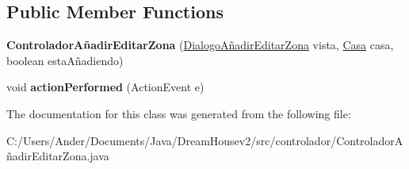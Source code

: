 \subsection*{Public Member Functions}
\begin{DoxyCompactItemize}
\item 
\mbox{\label{classcontrolador_1_1_controlador_a_xC3_xB1adir_editar_zona_a2a27c449b5c5bdd3a6f1cf05d600bd97}} 
{\bfseries Controlador\+Añadir\+Editar\+Zona} (\mbox{\hyperlink{classvista_1_1_dialogo_a_xC3_xB1adir_editar_zona}{Dialogo\+Añadir\+Editar\+Zona}} vista, \mbox{\hyperlink{classmodelo_1_1_casa}{Casa}} casa, boolean esta\+Añadiendo)
\item 
\mbox{\label{classcontrolador_1_1_controlador_a_xC3_xB1adir_editar_zona_adc1d0f47740fb96ef70428061228efd1}} 
void {\bfseries action\+Performed} (Action\+Event e)
\end{DoxyCompactItemize}


The documentation for this class was generated from the following file\+:\begin{DoxyCompactItemize}
\item 
C\+:/\+Users/\+Ander/\+Documents/\+Java/\+Dream\+Housev2/src/controlador/Controlador\+Añadir\+Editar\+Zona.\+java\end{DoxyCompactItemize}
